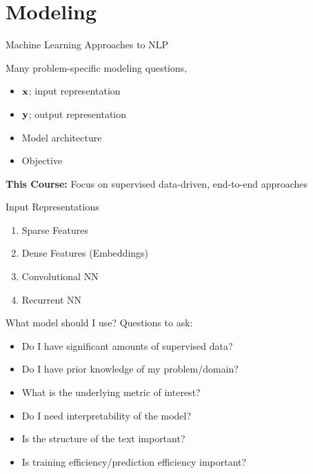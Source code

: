 \documentclass{beamer}
\begin{document}
\section{Modeling}



\begin{frame}{Machine Learning Approaches to NLP}
  
  Many problem-specific modeling questions,
  \begin{itemize}
  \item $\mathbf{x}$; input representation
  \item $\mathbf{y}$; output representation 
  \item Model architecture
  \item Objective
  \end{itemize}
  \air 

  \textbf{This Course:} Focus on supervised data-driven, end-to-end approaches
\end{frame}

\begin{frame}{Input Representations}
  \begin{enumerate}
  \item Sparse Features
  \item Dense Features (Embeddings)
  \item Convolutional NN
  \item Recurrent NN
  \end{enumerate}
\end{frame}

{

}

{

}


\begin{frame}{What model should I use?}
  Questions to ask: 
  \begin{itemize}
  \item Do I have significant amounts of supervised data?
  \item Do I have prior knowledge of my problem/domain?
  \item What is the underlying metric of interest?
  \item Do I need interpretability of the model? 
  \item Is the structure of the text important?
  \item Is training efficiency/prediction efficiency important?
  \end{itemize}
\end{frame}
\end{document}
